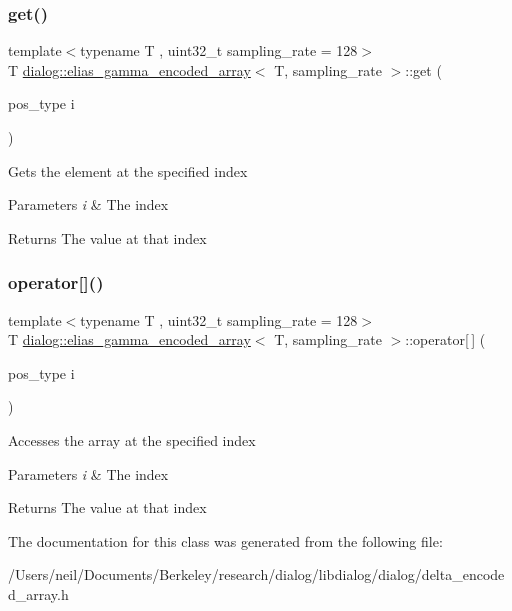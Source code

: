 \subsubsection{\texorpdfstring{get()}{get()}}
{\footnotesize\ttfamily template$<$typename T , uint32\+\_\+t sampling\+\_\+rate = 128$>$ \\
T \hyperlink{classdialog_1_1elias__gamma__encoded__array}{dialog\+::elias\+\_\+gamma\+\_\+encoded\+\_\+array}$<$ T, sampling\+\_\+rate $>$\+::get (\begin{DoxyParamCaption}\item[{pos\+\_\+type}]{i }\end{DoxyParamCaption})\hspace{0.3cm}{\ttfamily [inline]}}

Gets the element at the specified index 
\begin{DoxyParams}{Parameters}
{\em i} & The index \\
\hline
\end{DoxyParams}
\begin{DoxyReturn}{Returns}
The value at that index 
\end{DoxyReturn}
\mbox{\label{classdialog_1_1elias__gamma__encoded__array_ab9a186f942d1ce70c7a03b5b5a97fdbc}} 
\subsubsection{\texorpdfstring{operator[]()}{operator[]()}}
{\footnotesize\ttfamily template$<$typename T , uint32\+\_\+t sampling\+\_\+rate = 128$>$ \\
T \hyperlink{classdialog_1_1elias__gamma__encoded__array}{dialog\+::elias\+\_\+gamma\+\_\+encoded\+\_\+array}$<$ T, sampling\+\_\+rate $>$\+::operator\mbox{[}$\,$\mbox{]} (\begin{DoxyParamCaption}\item[{pos\+\_\+type}]{i }\end{DoxyParamCaption})\hspace{0.3cm}{\ttfamily [inline]}}

Accesses the array at the specified index 
\begin{DoxyParams}{Parameters}
{\em i} & The index \\
\hline
\end{DoxyParams}
\begin{DoxyReturn}{Returns}
The value at that index 
\end{DoxyReturn}


The documentation for this class was generated from the following file\+:\begin{DoxyCompactItemize}
\item 
/\+Users/neil/\+Documents/\+Berkeley/research/dialog/libdialog/dialog/delta\+\_\+encoded\+\_\+array.\+h\end{DoxyCompactItemize}
